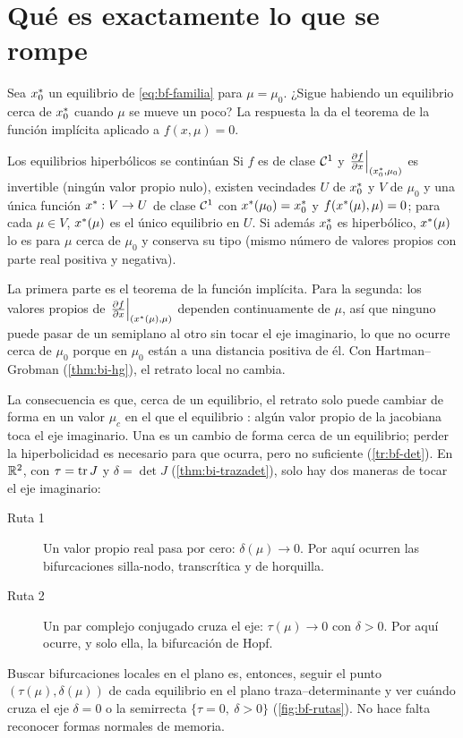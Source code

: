 \section{Qué es exactamente lo que se rompe}
\label{sec:bf-hiperbolicidad}

Sea $x^{*}_0$ un equilibrio de \eqref{eq:bf-familia} para $\mu=\mu_0$. ¿Sigue habiendo un equilibrio cerca de $x^{*}_0$ cuando $\mu$ se mueve un poco? La respuesta la da el teorema de la función implícita aplicado a $f(x,\mu)=0$.

\begin{proposicion}[label=prop:bf-implicita]{Los equilibrios hiperbólicos se continúan}
Si $f$ es de clase $\mathcal{C}^{1}$ y $\left.\frac{\partial f}{\partial x}\right|_{(x^{*}_0,\mu_0)}$ es invertible (ningún valor propio nulo), existen vecindades $U$ de $x^{*}_0$ y $V$ de $\mu_0$ y una única función $x^{*}:V\to U$ de clase $\mathcal{C}^{1}$ con $x^{*}(\mu_0)=x^{*}_0$ y $f(x^{*}(\mu),\mu)=0$; para cada $\mu\in V$, $x^{*}(\mu)$ es el único equilibrio en $U$. Si además $x^{*}_0$ es hiperbólico, $x^{*}(\mu)$ lo es para $\mu$ cerca de $\mu_0$ y conserva su tipo (mismo número de valores propios con parte real positiva y negativa).
\end{proposicion}

\begin{demostracion}
La primera parte es el teorema de la función implícita. Para la segunda: los valores propios de $\left.\frac{\partial f}{\partial x}\right|_{(x^{*}(\mu),\mu)}$ dependen continuamente de $\mu$, así que ninguno puede pasar de un semiplano al otro sin tocar el eje imaginario, lo que no ocurre cerca de $\mu_0$ porque en $\mu_0$ están a una distancia positiva de él. Con Hartman--Grobman (\cref{thm:bi-hg}), el retrato local no cambia.
\end{demostracion}

La consecuencia es que, cerca de un equilibrio, el retrato solo puede cambiar de forma en un valor $\mu_c$ en el que el equilibrio : algún valor propio de la jacobiana toca el eje imaginario. Una  es un cambio de forma cerca de un equilibrio; perder la hiperbolicidad es necesario para que ocurra, pero no suficiente (\cref{tr:bf-det}). En $\mathbb{R}^2$, con $\tau=\operatorname{tr} J$ y $\delta=\det J$ (\cref{thm:bi-trazadet}), solo hay dos maneras de tocar el eje imaginario:
\begin{description}
  \item[Ruta 1] Un valor propio real pasa por cero: $\delta(\mu)\to0$. Por aquí ocurren las bifurcaciones silla-nodo, transcrítica y de horquilla.
  \item[Ruta 2] Un par complejo conjugado cruza el eje: $\tau(\mu)\to0$ con $\delta>0$. Por aquí ocurre, y solo ella, la bifurcación de Hopf.
\end{description}
Buscar bifurcaciones locales en el plano es, entonces, seguir el punto $(\tau(\mu),\delta(\mu))$ de cada equilibrio en el plano traza--determinante y ver cuándo cruza el eje $\delta=0$ o la semirrecta $\{\tau=0,\ \delta>0\}$ (\cref{fig:bf-rutas}). No hace falta reconocer formas normales de memoria.

